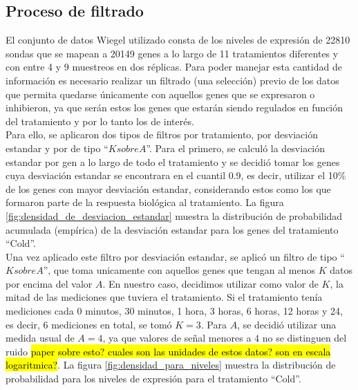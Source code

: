 \subsection{Proceso de filtrado}
El conjunto de datos Wiegel utilizado consta de los niveles de expresión de 22810 sondas que se mapean a 20149 genes a lo largo de 11 tratamientos diferentes y con entre 4 y 9 muestreos en dos réplicas. Para poder manejar esta cantidad de información es necesario realizar un filtrado (una selección) previo de los datos que permita quedarse únicamente con aquellos genes que se expresaron o inhibieron, ya que serán estos los genes que estarán siendo regulados en función del tratamiento y por lo tanto los de interés.\\
Para ello, se aplicaron dos tipos de filtros por tratamiento, por desviación estandar y por de tipo ``$K sobre A$''. Para el primero, se calculó la desviación estandar por gen a lo largo de todo el tratamiento y se decidió tomar los genes cuya desviación estandar se encontrara en el cuantil 0.9, es decir, utilizar el 10\% de los genes con mayor desviación estandar, considerando estos como los que formaron parte de la respuesta biológica al tratamiento. La figura \ref{fig:densidad_de_desviacion_estandar} muestra la distribución de probabilidad acumulada (empírica) de la desviación estandar para los genes del tratamiento ``Cold''.\\
Una vez aplicado este filtro por desviación estandar, se aplicó un filtro de tipo ``$K sobre A$'', que toma unicamente con aquellos genes que tengan al menos $K$ datos por encima del valor $A$. En nuestro caso, decidimos utilizar como valor de $K$, la mitad de las mediciones que tuviera el tratamiento. Si el tratamiento tenía mediciones cada 0 minutos, 30 minutos, 1 hora, 3 horas, 6 horas, 12 horas y 24, es decir, 6 mediciones en total, se tomó $K = 3$. Para $A$, se decidió utilizar una medida usual de $A=4$, ya que valores de señal menores a $4$ no se distinguen del ruido \hl{paper sobre esto? cuales son las unidades de estos datos? son en escala logaritmica?}. La figura \ref{fig:densidad_para_niveles} muestra la distribución de probabilidad para los niveles de expresión para el tratamiento ``Cold''.
